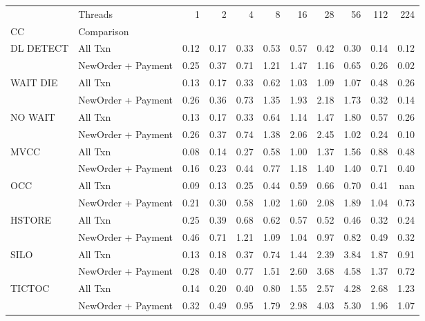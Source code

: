 \begin{tabular}{llrrrrrrrrr}
\toprule
       & Threads &  1   &  2   &  4   &  8   &  16  &  28  &  56  &  112 &  224 \\
CC & Comparison &      &      &      &      &      &      &      &      &      \\
\midrule
DL DETECT & All Txn & 0.12 & 0.17 & 0.33 & 0.53 & 0.57 & 0.42 & 0.30 & 0.14 & 0.12 \\
       & NewOrder + Payment & 0.25 & 0.37 & 0.71 & 1.21 & 1.47 & 1.16 & 0.65 & 0.26 & 0.02 \\
WAIT DIE & All Txn & 0.13 & 0.17 & 0.33 & 0.62 & 1.03 & 1.09 & 1.07 & 0.48 & 0.26 \\
       & NewOrder + Payment & 0.26 & 0.36 & 0.73 & 1.35 & 1.93 & 2.18 & 1.73 & 0.32 & 0.14 \\
NO WAIT & All Txn & 0.13 & 0.17 & 0.33 & 0.64 & 1.14 & 1.47 & 1.80 & 0.57 & 0.26 \\
       & NewOrder + Payment & 0.26 & 0.37 & 0.74 & 1.38 & 2.06 & 2.45 & 1.02 & 0.24 & 0.10 \\
MVCC & All Txn & 0.08 & 0.14 & 0.27 & 0.58 & 1.00 & 1.37 & 1.56 & 0.88 & 0.48 \\
       & NewOrder + Payment & 0.16 & 0.23 & 0.44 & 0.77 & 1.18 & 1.40 & 1.40 & 0.71 & 0.40 \\
OCC & All Txn & 0.09 & 0.13 & 0.25 & 0.44 & 0.59 & 0.66 & 0.70 & 0.41 &  nan \\
       & NewOrder + Payment & 0.21 & 0.30 & 0.58 & 1.02 & 1.60 & 2.08 & 1.89 & 1.04 & 0.73 \\
HSTORE & All Txn & 0.25 & 0.39 & 0.68 & 0.62 & 0.57 & 0.52 & 0.46 & 0.32 & 0.24 \\
       & NewOrder + Payment & 0.46 & 0.71 & 1.21 & 1.09 & 1.04 & 0.97 & 0.82 & 0.49 & 0.32 \\
SILO & All Txn & 0.13 & 0.18 & 0.37 & 0.74 & 1.44 & 2.39 & 3.84 & 1.87 & 0.91 \\
       & NewOrder + Payment & 0.28 & 0.40 & 0.77 & 1.51 & 2.60 & 3.68 & 4.58 & 1.37 & 0.72 \\
TICTOC & All Txn & 0.14 & 0.20 & 0.40 & 0.80 & 1.55 & 2.57 & 4.28 & 2.68 & 1.23 \\
       & NewOrder + Payment & 0.32 & 0.49 & 0.95 & 1.79 & 2.98 & 4.03 & 5.30 & 1.96 & 1.07 \\
\bottomrule
\end{tabular}
